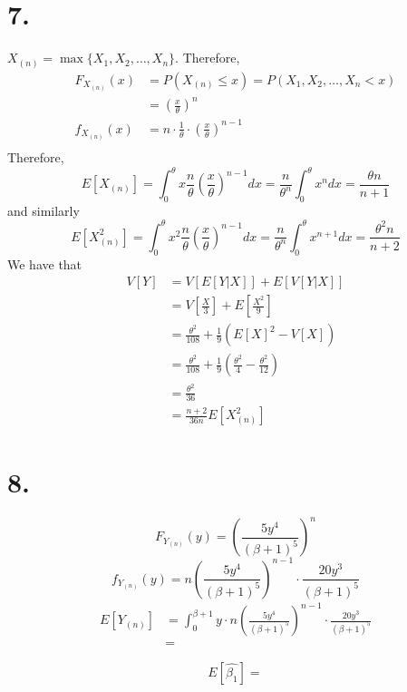 \documentclass[11pt]{article}
\begin{document}
\section*{7.}
$X_{(n)} = \max\{X_1, X_2, \ldots, X_n\}$. Therefore, 
\begin{equation*}
    \begin{aligned}
        F_{X_{(n)}}(x) &= P(X_{(n)} \le x) = P(X_1, X_2, \ldots, X_n < x) \\
        &= \left(\frac{x}{\theta}\right)^n \\
        f_{X_{(n)}}(x) &= n \cdot \frac{1}{\theta} \cdot \left(\frac{x}{\theta}\right)^{n-1}\\
    \end{aligned}
\end{equation*}
Therefore, 
\[
    E[X_{(n)}] = \int_0^{\theta} x \frac{n}{\theta}  \left(\frac{x}{\theta} \right)^{n-1} dx 
    = \frac{n}{\theta^n} \int_0^\theta x^n dx = \frac{\theta n }{n+1}    
\]
and similarly
\[
    E[X_{(n)}^2] = \int_0^{\theta} x^2 \frac{n}{\theta}  \left(\frac{x}{\theta} \right)^{n-1} dx 
    = \frac{n}{\theta^n} \int_0^\theta x^{n+1} dx = \frac{\theta^2 n }{n+2}
\]
We have that 
\begin{equation*}
    \begin{aligned}
        V[Y] &= V[E[Y|X]] + E[V[Y|X]] \\
        &= V\left[\frac{X}{3} \right] + E\left[\frac{X^2}{9} \right] \\
        &= \frac{\theta^2}{108}  + \frac{1}{9} (E[X]^2 - V[X]) \\
        &= \frac{\theta^2}{108}  + \frac{1}{9} \left(\frac{\theta^2}{4} - \frac{\theta^2}{12} \right) \\
        &= \frac{\theta^{2}}{36} \\
        &= \frac{n+2}{36n}E[X_{(n)}^2]
    \end{aligned}
\end{equation*}
\pagebreak
\section*{8.}
\[
    F_{Y_{(n)}}(y) = \left(\frac{5y^4}{(\beta+1)^5} \right)^n    
\]
\[
    f_{Y_{(n)}}(y) = n \left(\frac{5y^4}{(\beta+1)^5} \right)^{n-1} \cdot \frac{20y^3}{(\beta+1)^5}
\]
\begin{equation*}
    \begin{aligned}
        E[Y_{(n)}] 
        &= \int_0^{\beta+1} y \cdot n \left(\frac{5y^4}{(\beta+1)^5} \right)^{n-1} \cdot \frac{20y^3}{(\beta+1)^5} \\
        &=
    \end{aligned}
\end{equation*}

\[
    E[\hat{\beta_1}] =     
\]
\end{document}
